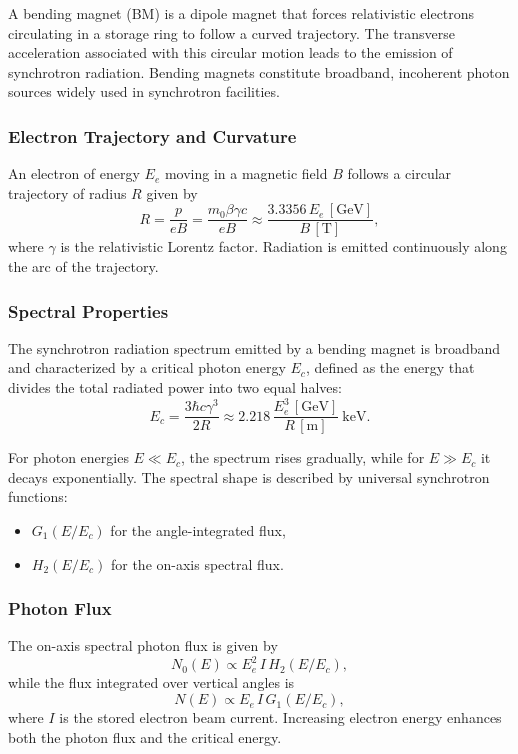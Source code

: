 A bending magnet (BM) is a dipole magnet that forces relativistic electrons circulating in a storage ring to follow a curved trajectory. The transverse acceleration associated with this circular motion leads to the emission of synchrotron radiation. Bending magnets constitute broadband, incoherent photon sources widely used in synchrotron facilities.

\subsubsection{Electron Trajectory and Curvature}

An electron of energy $E_e$ moving in a magnetic field $B$ follows a circular trajectory of radius $R$ given by
\begin{equation}
R = \frac{p}{eB} = \frac{m_0 \beta \gamma c}{eB}
\approx \frac{3.3356\,E_e\,[\mathrm{GeV}]}{B\,[\mathrm{T}]} ,
\end{equation}
where $\gamma$ is the relativistic Lorentz factor. Radiation is emitted continuously along the arc of the trajectory.

\subsubsection{Spectral Properties}

The synchrotron radiation spectrum emitted by a bending magnet is broadband and characterized by a critical photon energy $E_c$, defined as the energy that divides the total radiated power into two equal halves:
\begin{equation}
E_c = \frac{3\hbar c \gamma^3}{2R}
\approx 2.218 \, \frac{E_e^3\,[\mathrm{GeV}]}{R\,[\mathrm{m}]} \ \mathrm{keV}.
\end{equation}

For photon energies $E \ll E_c$, the spectrum rises gradually, while for $E \gg E_c$ it decays exponentially. The spectral shape is described by universal synchrotron functions:
\begin{itemize}
\item $G_1(E/E_c)$ for the angle-integrated flux,
\item $H_2(E/E_c)$ for the on-axis spectral flux.
\end{itemize}

\subsubsection{Photon Flux}

The on-axis spectral photon flux is given by
\begin{equation}
N_0(E) \propto E_e^2 \, I \, H_2(E/E_c),
\end{equation}
while the flux integrated over vertical angles is
\begin{equation}
N(E) \propto E_e \, I \, G_1(E/E_c),
\end{equation}
where $I$ is the stored electron beam current. Increasing electron energy enhances both the photon flux and the critical energy.

